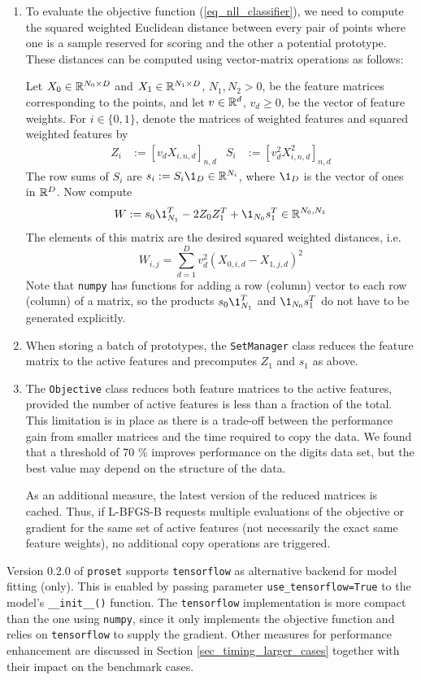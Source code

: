 \begin{enumerate}
\item To evaluate the objective function (\ref{eq_nll_classifier}), we need to compute the squared weighted Euclidean distance between every pair of points where one is a sample reserved for scoring and the other a potential prototype.
These distances can be computed using vector-matrix operations as follows:\par
%
Let $X_0\in\mathbb{R}^{N_0\times D}$ and $X_1\in\mathbb{R}^{N_1\times D}$, $N_1,N_2>0$, be the feature matrices corresponding to the points, and let $v\in\mathbb{R}^d$, $v_d\geq0$, be the vector of feature weights.
For $i\in\{0,1\}$, denote the matrices of weighted features and squared weighted features by
%
\begin{align}
Z_i&:=[v_dX_{i,n,d}]_{n,d}&S_i&:=[v_d^2X_{i,n,d}^2]_{n,d}\label{eq_ZiSi}
\end{align}
%
The row sums of $S_i$ are $s_i:=S_i\1_D\in\R^{N_i}$, where $\1_D$ is the vector of ones in $\mathbb{R}^D$.
Now compute
%
\begin{equation}
W:=s_0\1_{N_1}^T-2Z_0Z_1^T+\1_{N_0}s_1^T\in\R^{N_0,N_1}\label{eq_W}
\end{equation}
%
The elements of this matrix are the desired squared weighted distances, i.e.\
%
\begin{equation}
W_{i,j}=\sum_{d=1}^Dv_d^2(X_{0,i,d}-X_{1,j,d})^2\label{eq_Wij}
\end{equation}
%
Note that \texttt{numpy} has functions for adding a row (column) vector to each row (column) of a matrix, so the products $s_0\1_{N_1}^T$ and $\1_{N_0}s_1^T$ do not have to be generated explicitly.
%
\item When storing a batch of prototypes, the \texttt{SetManager} class reduces the feature matrix to the active features and precomputes $Z_1$ and $s_1$ as above.
%
\item The \texttt{Objective} class reduces both feature matrices to the active features, provided the number of active features is less than a fraction of the total.
This limitation is in place as there is a trade-off between the performance gain from smaller matrices and the time required to copy the data.
We found that a threshold of 70 \% improves performance on the digits data set, but the best value may depend on the structure of the data.\par
%
As an additional measure, the latest version of the reduced matrices is cached.
Thus, if L-BFGS-B requests multiple evaluations of the objective or gradient for the same set of active features (not necessarily the exact same feature weights), no additional copy operations are triggered.
\end{enumerate}
%
Version 0.2.0 of \texttt{proset} supports \texttt{tensorflow} as alternative backend for model fitting (only).
This is enabled by passing parameter \texttt{use\_tensorflow=True} to the model's \texttt{\_\_init\_\_()} function.
The \texttt{tensorflow} implementation is more compact than the one using \texttt{numpy}, since it only implements the objective function and relies on \texttt{tensorflow} to supply the gradient.
Other measures for performance enhancement are discussed in Section \ref{sec_timing_larger_cases} together with their impact on the benchmark cases.
\endinput
